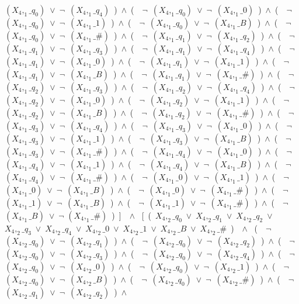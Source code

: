 ﻿\documentclass[a4paper,10pt]{article}
\begin{document}
$(X_4,_1\_q_0)$\ $\vee$\ $\neg$\ $(X_4,_1\_q_4)$\ )\ $\wedge$\ (\ \ $\neg$\ $(X_4,_1\_q_0)$\ $\vee$\ $\neg$\ $(X_4,_1\_0)$\ )\ $\wedge$\ (\ \ $\neg$\ $(X_4,_1\_q_0)$\ $\vee$\ $\neg$\ $(X_4,_1\_1)$\ )\ $\wedge$\ (\ \ $\neg$\ $(X_4,_1\_q_0)$\ $\vee$\ $\neg$\ $(X_4,_1\_B)$\ )\ $\wedge$\ (\ \ $\neg$\ $(X_4,_1\_q_0)$\ $\vee$\ $\neg$\ $(X_4,_1\_\#)$\ )\ $\wedge$\ (\ \ $\neg$\ $(X_4,_1\_q_1)$\ $\vee$\ $\neg$\ $(X_4,_1\_q_2)$\ )\ $\wedge$\ (\ \ $\neg$\ $(X_4,_1\_q_1)$\ $\vee$\ $\neg$\ $(X_4,_1\_q_3)$\ )\ $\wedge$\ (\ \ $\neg$\ $(X_4,_1\_q_1)$\ $\vee$\ $\neg$\ $(X_4,_1\_q_4)$\ )\ $\wedge$\ (\ \ $\neg$\ $(X_4,_1\_q_1)$\ $\vee$\ $\neg$\ $(X_4,_1\_0)$\ )\ $\wedge$\ (\ \ $\neg$\ $(X_4,_1\_q_1)$\ $\vee$\ $\neg$\ $(X_4,_1\_1)$\ )\ $\wedge$\ (\ \ $\neg$\ $(X_4,_1\_q_1)$\ $\vee$\ $\neg$\ $(X_4,_1\_B)$\ )\ $\wedge$\ (\ \ $\neg$\ $(X_4,_1\_q_1)$\ $\vee$\ $\neg$\ $(X_4,_1\_\#)$\ )\ $\wedge$\ (\ \ $\neg$\ $(X_4,_1\_q_2)$\ $\vee$\ $\neg$\ $(X_4,_1\_q_3)$\ )\ $\wedge$\ (\ \ $\neg$\ $(X_4,_1\_q_2)$\ $\vee$\ $\neg$\ $(X_4,_1\_q_4)$\ )\ $\wedge$\ (\ \ $\neg$\ $(X_4,_1\_q_2)$\ $\vee$\ $\neg$\ $(X_4,_1\_0)$\ )\ $\wedge$\ (\ \ $\neg$\ $(X_4,_1\_q_2)$\ $\vee$\ $\neg$\ $(X_4,_1\_1)$\ )\ $\wedge$\ (\ \ $\neg$\ $(X_4,_1\_q_2)$\ $\vee$\ $\neg$\ $(X_4,_1\_B)$\ )\ $\wedge$\ (\ \ $\neg$\ $(X_4,_1\_q_2)$\ $\vee$\ $\neg$\ $(X_4,_1\_\#)$\ )\ $\wedge$\ (\ \ $\neg$\ $(X_4,_1\_q_3)$\ $\vee$\ $\neg$\ $(X_4,_1\_q_4)$\ )\ $\wedge$\ (\ \ $\neg$\ $(X_4,_1\_q_3)$\ $\vee$\ $\neg$\ $(X_4,_1\_0)$\ )\ $\wedge$\ (\ \ $\neg$\ $(X_4,_1\_q_3)$\ $\vee$\ $\neg$\ $(X_4,_1\_1)$\ )\ $\wedge$\ (\ \ $\neg$\ $(X_4,_1\_q_3)$\ $\vee$\ $\neg$\ $(X_4,_1\_B)$\ )\ $\wedge$\ (\ \ $\neg$\ $(X_4,_1\_q_3)$\ $\vee$\ $\neg$\ $(X_4,_1\_\#)$\ )\ $\wedge$\ (\ \ $\neg$\ $(X_4,_1\_q_4)$\ $\vee$\ $\neg$\ $(X_4,_1\_0)$\ )\ $\wedge$\ (\ \ $\neg$\ $(X_4,_1\_q_4)$\ $\vee$\ $\neg$\ $(X_4,_1\_1)$\ )\ $\wedge$\ (\ \ $\neg$\ $(X_4,_1\_q_4)$\ $\vee$\ $\neg$\ $(X_4,_1\_B)$\ )\ $\wedge$\ (\ \ $\neg$\ $(X_4,_1\_q_4)$\ $\vee$\ $\neg$\ $(X_4,_1\_\#)$\ )\ $\wedge$\ (\ \ $\neg$\ $(X_4,_1\_0)$\ $\vee$\ $\neg$\ $(X_4,_1\_1)$\ )\ $\wedge$\ (\ \ $\neg$\ $(X_4,_1\_0)$\ $\vee$\ $\neg$\ $(X_4,_1\_B)$\ )\ $\wedge$\ (\ \ $\neg$\ $(X_4,_1\_0)$\ $\vee$\ $\neg$\ $(X_4,_1\_\#)$\ )\ $\wedge$\ (\ \ $\neg$\ $(X_4,_1\_1)$\ $\vee$\ $\neg$\ $(X_4,_1\_B)$\ )\ $\wedge$\ (\ \ $\neg$\ $(X_4,_1\_1)$\ $\vee$\ $\neg$\ $(X_4,_1\_\#)$\ )\ $\wedge$\ (\ \ $\neg$ $(X_4,_1\_B)$\ $\vee$\ $\neg$ $(X_4,_1\_\#)$\ )\ ]\ \ $\wedge$ \ [\ (\ $X_4,_2\_q_0$\ $\vee$\ $X_4,_2\_q_1$\ $\vee$\ $X_4,_2\_q_2$\ $\vee$\ $X_4,_2\_q_3$\ $\vee$\ $X_4,_2\_q_4$\ $\vee$\ $X_4,_2\_0$\ $\vee$\ $X_4,_2\_1$\ $\vee$\ $X_4,_2\_B$\ $\vee$\ $X_4,_2\_\#$\ )\ \ $\wedge$ \ (\ \ $\neg$\ $(X_4,_2\_q_0)$\ $\vee$\ $\neg$\ $(X_4,_2\_q_1)$\ )\ $\wedge$\ (\ \ $\neg$\ $(X_4,_2\_q_0)$\ $\vee$\ $\neg$\ $(X_4,_2\_q_2)$\ )\ $\wedge$\ (\ \ $\neg$\ $(X_4,_2\_q_0)$\ $\vee$\ $\neg$\ $(X_4,_2\_q_3)$\ )\ $\wedge$\ (\ \ $\neg$\ $(X_4,_2\_q_0)$\ $\vee$\ $\neg$\ $(X_4,_2\_q_4)$\ )\ $\wedge$\ (\ \ $\neg$\ $(X_4,_2\_q_0)$\ $\vee$\ $\neg$\ $(X_4,_2\_0)$\ )\ $\wedge$\ (\ \ $\neg$\ $(X_4,_2\_q_0)$\ $\vee$\ $\neg$\ $(X_4,_2\_1)$\ )\ $\wedge$\ (\ \ $\neg$\ $(X_4,_2\_q_0)$\ $\vee$\ $\neg$\ $(X_4,_2\_B)$\ )\ $\wedge$\ (\ \ $\neg$\ $(X_4,_2\_q_0)$\ $\vee$\ $\neg$\ $(X_4,_2\_\#)$\ )\ $\wedge$\ (\ \ $\neg$\ $(X_4,_2\_q_1)$\ $\vee$\ $\neg$\ $(X_4,_2\_q_2)$\ )\ $\wedge$\ 
\end{document}
